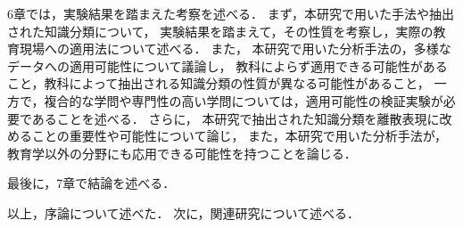 6章では，実験結果を踏まえた考察を述べる．
まず，本研究で用いた手法や抽出された知識分類について，
実験結果を踏まえて，その性質を考察し，実際の教育現場への適用法について述べる．
また，
本研究で用いた分析手法の，多様なデータへの適用可能性について議論し，
教科によらず適用できる可能性があること，教科によって抽出される知識分類の性質が異なる可能性があること，
一方で，複合的な学問や専門性の高い学問については，適用可能性の検証実験が必要であることを述べる．
さらに，
本研究で抽出された知識分類を離散表現に改めることの重要性や可能性について論じ，
また，本研究で用いた分析手法が，教育学以外の分野にも応用できる可能性を持つことを論じる．


最後に，7章で結論を述べる．



\vvspace
以上，序論について述べた．
次に，関連研究について述べる．


